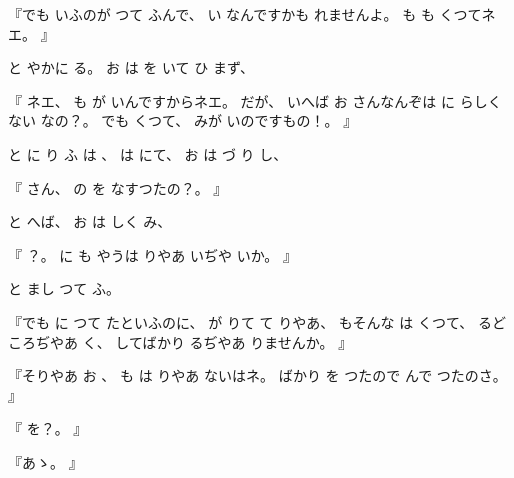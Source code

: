 『でも
いふのが
つて
ふんで、
い
なんですかも
れませんよ。
も
も
くつてネエ。
』

と
やかに
る。
お
は
を
いて
ひ
まず、

『
ネエ、
も
が
いんですからネエ。
だが、
いへば
お
さんなんぞは
に
らしくない
なの？。
でも
くつて、
みが
いのですもの！。
』

と
に
り
ふ
は
、
は
にて、
お
は
づ
り
し、

『
さん、
の
を
なすつたの？。
』

と
へば、
お
は
しく
み、

『
？。
に
も
やうは
りやあ
いぢや
いか。
』

と
まし
つて
ふ。

『でも
に
つて
たといふのに、
が
りて
て
りやあ、
もそんな
は
くつて、
るどころぢやあ
く、
してばかり
るぢやあ
りませんか。
』

『そりやあ
お
、
も
は
りやあ
ないはネ。
ばかり
を
つたので
んで
つたのさ。
』

『
を？。
』

『あゝ。
』

